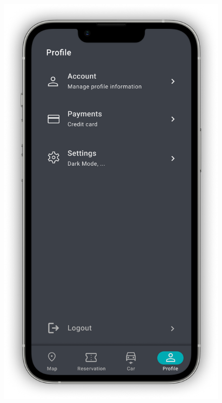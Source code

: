 \begin{figure}[H]
{        \includegraphics[scale=0.32]{src/mockups/profile.png}
    }
    \newline
\end{figure}

